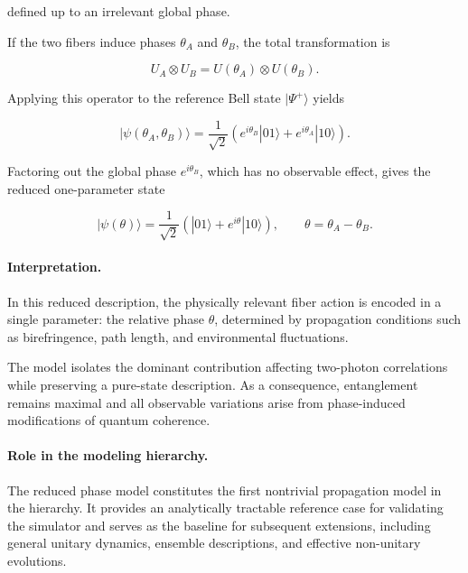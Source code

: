 defined up to an irrelevant global phase.

\medskip

If the two fibers induce phases \( \theta_A \) and \( \theta_B \), the total transformation is

\begin{equation}
U_A \otimes U_B
=
U(\theta_A) \otimes U(\theta_B).
\label{eq:two_arm_phase_unitary}
\end{equation}

Applying this operator to the reference Bell state \( |\Psi^+\rangle \) yields

\begin{equation}
|\psi(\theta_A,\theta_B)\rangle
=
\frac{1}{\sqrt{2}}
\left(
e^{i\theta_B}|01\rangle
+
e^{i\theta_A}|10\rangle
\right).
\label{eq:two_phase_bell_state}
\end{equation}

Factoring out the global phase \( e^{i\theta_B} \), which has no observable effect, gives the reduced one-parameter state

\begin{equation}
|\psi(\theta)\rangle
=
\frac{1}{\sqrt{2}}
\left(
|01\rangle
+
e^{i\theta}|10\rangle
\right),
\qquad
\theta = \theta_A - \theta_B.
\label{eq:reduced_phase_bell_state}
\end{equation}

\medskip

\paragraph{Interpretation.}

In this reduced description, the physically relevant fiber action is encoded in a single parameter: the relative phase \( \theta \), determined by propagation conditions such as birefringence, path length, and environmental fluctuations.

The model isolates the dominant contribution affecting two-photon correlations while preserving a pure-state description. As a consequence, entanglement remains maximal and all observable variations arise from phase-induced modifications of quantum coherence.

\medskip

\paragraph{Role in the modeling hierarchy.}

The reduced phase model constitutes the first nontrivial propagation model in the hierarchy. It provides an analytically tractable reference case for validating the simulator and serves as the baseline for subsequent extensions, including general unitary dynamics, ensemble descriptions, and effective non-unitary evolutions.

